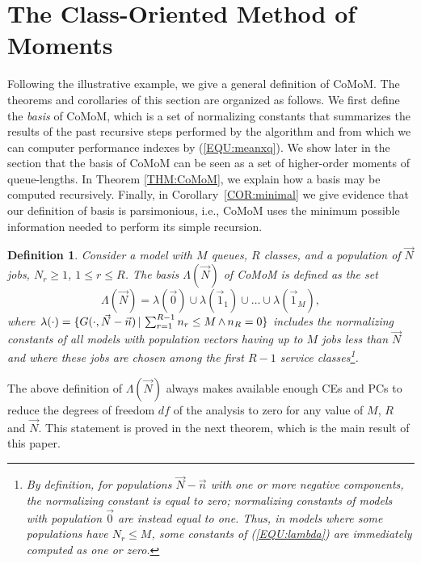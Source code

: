 \documentclass[journal,twocolumn,9.5pt]{IEEEtran}
\newtheorem{definition}{Definition}
\begin{document}
\section{The Class-Oriented Method of Moments}
\label{SEC:CoMoM}
Following the illustrative example, we give a general definition of CoMoM. The theorems and corollaries of this section are organized as follows. We first define the {\em basis} of CoMoM, which is a set of normalizing constants that summarizes the results of the past recursive steps performed by the algorithm and from which we can computer performance indexes by (\ref{EQU:meanxq}). We show later in the section that the basis of CoMoM can be seen as a set of higher-order moments of queue-lengths. In Theorem \ref{THM:CoMoM}, we explain how a basis may be computed recursively. Finally, in Corollary~\ref{COR:minimal} we give evidence that our definition of basis is parsimonious, i.e., CoMoM uses the minimum possible information needed to perform its simple recursion.
\begin{definition}{\em
Consider a model with $M$ queues, $R$ classes, and a population of $\vec N$ jobs, $N_r\geq 1$, $1\leq r\leq R$.
The {\em basis} ${\Lambda}(\vec N)$ of CoMoM is defined as the set
\begin{equation}
\label{EQU:lambda}
{\Lambda}(\vec N)={\lambda}(\vec 0)\cup \lambda(\vec 1_1)\cup \ldots \cup \lambda(\vec 1_M),
\end{equation}
where
$
\lambda(\cdot)=\{G(\cdot,\vec N-\vec n)\,|\, \textstyle \sum_{r=1}^{R-1} n_r\leq M {\,\rm \wedge\,} n_R=0\}
$
includes the normalizing constants of all models with population vectors having up to $M$ jobs less than $\vec N$ and where these jobs are chosen among the first $R-1$ service classes\footnote{By definition, for populations $\vec N-\vec n$ with one or more negative components, the normalizing constant is equal to zero; normalizing constants of models with population $\vec 0$ are instead equal to one. Thus, in models where some populations have $N_r\leq M$, some constants of (\ref{EQU:lambda}) are immediately computed as one or zero.}. }
\end{definition}

The above definition of $\Lambda(\vec N)$ always makes available enough CEs and PCs to reduce the degrees of freedom $df$ of the analysis to zero for any value of $M$, $R$ and $\vec N$. This statement is proved in the next theorem, which is the main result of this paper.
\end{document}
